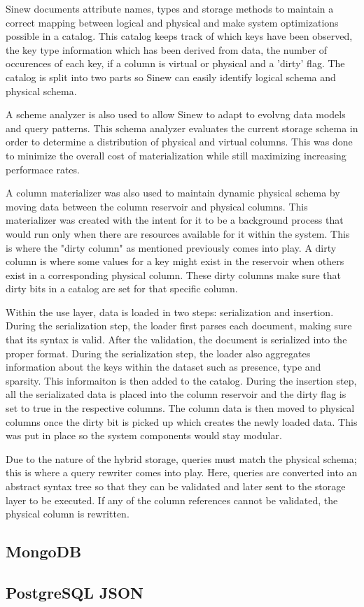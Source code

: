 \documentclass[sigconf]{acmart}
\begin{document}
    Sinew documents attribute names, types and storage methods to maintain a correct mapping between logical and physical and make system optimizations possible in a catalog. This catalog keeps track of which keys have been observed, the key type information which has been derived from data, the number of occurences of each key, if a column is virtual or physical and a 'dirty' flag. The catalog is split into two parts so Sinew can easily identify logical schema and physical schema. 

    A scheme analyzer is also used to allow Sinew to adapt to evolvng data models and query patterns. This schema analyzer evaluates the current storage schema in order to determine a distribution of physical and virtual columns. This was done to minimize the overall cost of materialization while still maximizing increasing performace rates. 

    A column materializer was also used to maintain dynamic physical schema by moving data between the column reservoir and physical columns. This materializer was created with the intent for it to be a background process that would run only when there are resources available for it within the system. This is where the "dirty column" as mentioned previously comes into play. A dirty column is where some values for a key might exist in the reservoir when others exist in a corresponding physical column. These dirty columns make sure that dirty bits in a catalog are set for that specific column. 

    Within the use layer, data is loaded in two steps: serialization and insertion. During the serialization step, the loader first parses each document, making sure that its syntax is valid. After the validation, the document is serialized into the proper format. During the serialization step, the loader also aggregates information about the keys within the dataset such as presence, type and sparsity. This informaiton is then added to the catalog. During the insertion step, all the serializated data is placed into the column reservoir and the dirty flag is set to true in the respective columns. The column data is then moved to physical columns once the dirty bit is picked up which creates the newly loaded data. This was put in place so the system components would stay modular. 

    Due to the nature of the hybrid storage, queries must match the physical schema; this is where a query rewriter comes into play. Here, queries are converted into an abstract syntax tree so that they can be validated and later sent to the storage layer to be executed. If any of the column references cannot be validated, the physical column is rewritten. 


    \subsection{MongoDB}


    \subsection{PostgreSQL JSON}
    
    



\end{document}
